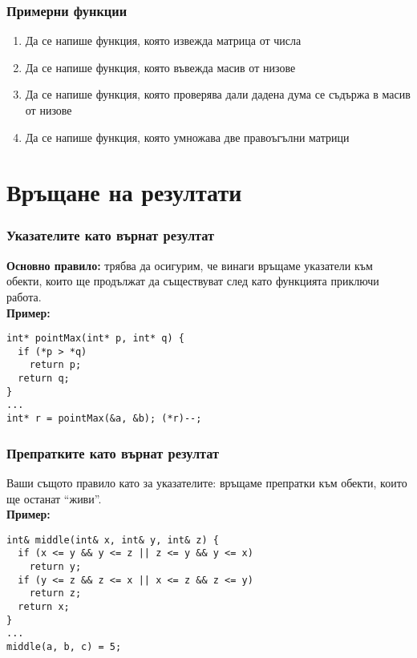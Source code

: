 \documentclass[alsotrans]{beamerswitch}
\begin{document}
\begin{frame}
  \frametitle{Примерни функции}

  \begin{enumerate}[<+->]
  \item Да се напише функция, която извежда матрица от числа
  \item Да се напише функция, която въвежда масив от низове
  \item Да се напише функция, която проверява дали дадена дума се съдържа в масив от низове
  \item Да се напише функция, която умножава две правоъгълни матрици
  \end{enumerate}
\end{frame}

\section{Връщане на резултати}

\begin{frame}[fragile]
  \frametitle{Указателите като върнат резултат}

  \textbf{Основно правило:} трябва да осигурим, че винаги връщаме указатели към обекти, които ще продължат да съществуват след като функцията приключи работа.\\[2em]
  \pause
  \textbf{Пример:}
\begin{lstlisting}
int* pointMax(int* p, int* q) {
  if (*p > *q)
    return p;
  return q;
}
...
int* r = pointMax(&a, &b); (*r)--;
\end{lstlisting}
\end{frame}

\begin{frame}[fragile]
  \frametitle{Препратките като върнат резултат}

  Ваши същото правило като за указателите: връщаме препратки към обекти, които ще останат ``живи''.\\[2em]
  \pause
  \textbf{Пример:}
\begin{lstlisting}
int& middle(int& x, int& y, int& z) {
  if (x <= y && y <= z || z <= y && y <= x)
    return y;
  if (y <= z && z <= x || x <= z && z <= y)
    return z;
  return x;
}
...
middle(a, b, c) = 5;
\end{lstlisting}
\end{frame}
\end{document}
